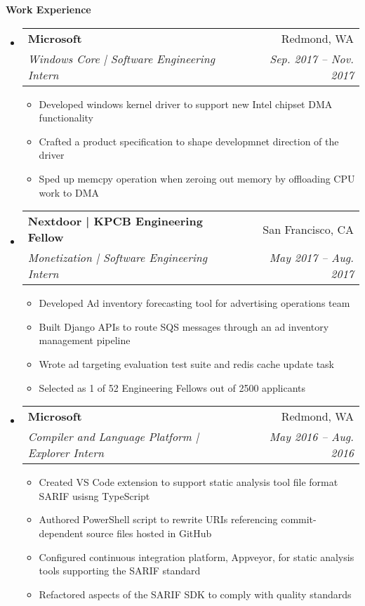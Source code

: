\documentclass[letterpaper,10pt]{article}
\makeatletter
\newcommand{\resitem}[1]{\item #1 \vspace{-2pt}}
\newcommand{\resheading}[1]{{\large \colorbox{mygrey}{\begin{minipage}{\textwidth}{\textbf{#1 \vphantom{p\^{E}}}}\end{minipage}}}}
\newcommand{\ressubheading}[4]{
\begin{tabular*}{7.0in}{l@{\extracolsep{\fill}}r}
		\textbf{#1} & #2 \\
		\textit{#3} & \textit{#4} \\
\end{tabular*}\vspace{-6pt}}
\makeatother
\begin{document}
\resheading{Work Experience}
\begin{itemize}
\item
	\ressubheading{Microsoft}{Redmond, WA}{Windows Core | Software Engineering Intern}{Sep. 2017 -- Nov. 2017}
	\begin{itemize}
    \resitem{Developed windows kernel driver to support new Intel chipset DMA functionality}
    \resitem{Crafted a product specification to shape developmnet direction of the driver}
    \resitem{Sped up memcpy operation when zeroing out memory by offloading CPU work to DMA}
	\end{itemize}
\item
	\ressubheading{Nextdoor | KPCB Engineering Fellow}{San Francisco, CA}{Monetization | Software Engineering Intern}{May 2017 -- Aug. 2017}
	\begin{itemize}
		\resitem{Developed Ad inventory forecasting tool for advertising operations team}
		\resitem{Built Django APIs to route SQS messages through an ad inventory management pipeline}
		\resitem{Wrote ad targeting evaluation test suite and redis cache update task}
		\resitem{Selected as 1 of 52 Engineering Fellows out of 2500 applicants}
	\end{itemize}
\item
	\ressubheading{Microsoft}{Redmond, WA}{Compiler and Language Platform | Explorer Intern}{May 2016 -- Aug. 2016}
	\begin{itemize}
		\resitem{Created VS Code extension to support static analysis tool file format SARIF usisng TypeScript}
	  \resitem{Authored PowerShell script to rewrite URIs referencing commit-dependent source files hosted in GitHub}
		\resitem{Configured continuous integration platform, Appveyor, for static analysis tools supporting the SARIF standard}
		\resitem{Refactored aspects of the SARIF SDK to comply with quality standards}
	\end{itemize}
\end{itemize}
\end{document}
